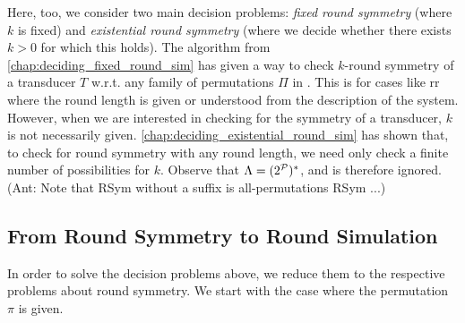 Here, too, we consider two main decision problems: \emph{fixed round symmetry} (where $k$ is fixed) and \emph{existential round symmetry} (where we decide whether there exists $k>0$ for which this holds). The algorithm from \autoref{chap:deciding_fixed_round_sim} has given a way to check $k$-round symmetry of a transducer $T$ w.r.t.\! any family of permutations $\Pi$ in \PSPACE. This is for cases like \gls{rr} where the round length is given or understood from the description of the system. However, when we are interested in checking for the symmetry of a transducer, $k$ is not necessarily given. \autoref{chap:deciding_existential_round_sim} has shown that, to check for round symmetry with any round length, we need only check a finite number of possibilities for $k$. Observe that $\Lambda=(2^{\mathcal{P}})^*$, and is therefore ignored. (Ant: Note that RSym without a suffix is all-permutations RSym ...)

\subsection*{From Round Symmetry to Round Simulation}
\label{sec:symmetry_to_simulation}
In order to solve the decision problems above, we reduce them to the respective problems about round symmetry. We start with the case where the permutation $\pi$ is given.

